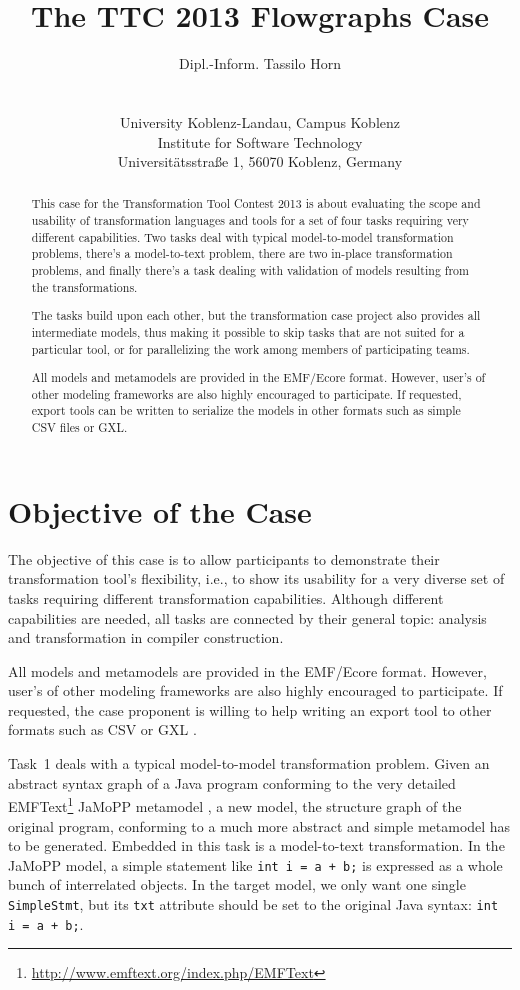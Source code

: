 \documentclass[11pt]{article}
\title{The TTC 2013 Flowgraphs Case}
\author{Dipl.-Inform. Tassilo Horn\\
  \myemail\\
  \vspace{0.3cm}\\
  University Koblenz-Landau, Campus Koblenz\\
  Institute for Software Technology\\
  Universitätsstraße 1, 56070 Koblenz, Germany}
\begin{document}
\maketitle

\begin{abstract}
  This case for the Transformation Tool Contest 2013 is about evaluating the
  scope and usability of transformation languages and tools for a set of four
  tasks requiring very different capabilities.  Two tasks deal with typical
  model-to-model transformation problems, there's a model-to-text problem,
  there are two in-place transformation problems, and finally there's a task
  dealing with validation of models resulting from the transformations.

  The tasks build upon each other, but the transformation case project also
  provides all intermediate models, thus making it possible to skip tasks that
  are not suited for a particular tool, or for parallelizing the work among
  members of participating teams.

  All models and metamodels are provided in the EMF/Ecore format.  However,
  user's of other modeling frameworks are also highly encouraged to
  participate.  If requested, export tools can be written to serialize the
  models in other formats such as simple CSV files or GXL.
\end{abstract}

\sloppy

\section{Objective of the Case}
\label{sec:objective}

The objective of this case is to allow participants to demonstrate their
transformation tool's flexibility, i.e., to show its usability for a very
diverse set of tasks requiring different transformation capabilities.  Although
different capabilities are needed, all tasks are connected by their general
topic: analysis and transformation in compiler construction.

All models and metamodels are provided in the EMF/Ecore format.  However,
user's of other modeling frameworks are also highly encouraged to participate.
If requested, the case proponent is willing to help writing an export tool to
other formats such as CSV or GXL \cite{GXL02}.

Task~1 deals with a typical model-to-model transformation problem.  Given an
abstract syntax graph of a Java program conforming to the very detailed
EMFText\footnote{\url{http://www.emftext.org/index.php/EMFText}} JaMoPP
metamodel \cite{jamopp09}, a new model, the structure graph of the original
program, conforming to a much more abstract and simple metamodel has to be
generated.  Embedded in this task is a model-to-text transformation.  In the
JaMoPP model, a simple statement like \verb|int i = a + b;| is expressed as a
whole bunch of interrelated objects.  In the target model, we only want one
single \verb|SimpleStmt|, but its \verb|txt| attribute should be set to the
original Java syntax: \verb|int i = a + b;|.
\end{document}
